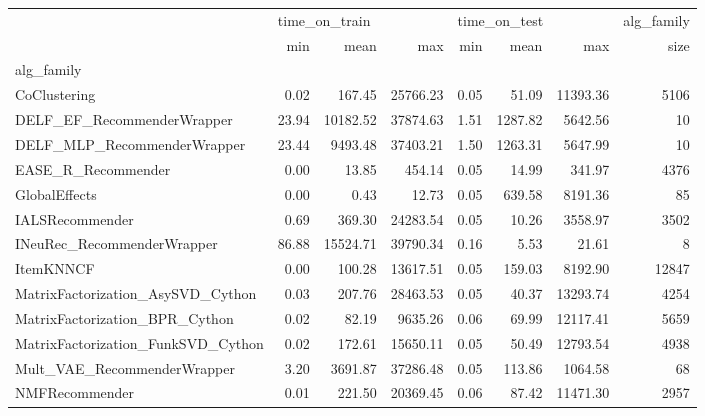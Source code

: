 \begin{tabular}{lrrrrrrr}
\toprule
{} & \multicolumn{3}{l}{time_on_train} & \multicolumn{3}{l}{time_on_test} & alg_family \\
{} &           min &     mean &      max &          min &    mean &      max &       size \\
alg_family                         &               &          &          &              &         &          &            \\
\midrule
CoClustering                       &          0.02 &   167.45 & 25766.23 &         0.05 &   51.09 & 11393.36 &       5106 \\
DELF_EF_RecommenderWrapper         &         23.94 & 10182.52 & 37874.63 &         1.51 & 1287.82 &  5642.56 &         10 \\
DELF_MLP_RecommenderWrapper        &         23.44 &  9493.48 & 37403.21 &         1.50 & 1263.31 &  5647.99 &         10 \\
EASE_R_Recommender                 &          0.00 &    13.85 &   454.14 &         0.05 &   14.99 &   341.97 &       4376 \\
GlobalEffects                      &          0.00 &     0.43 &    12.73 &         0.05 &  639.58 &  8191.36 &         85 \\
IALSRecommender                    &          0.69 &   369.30 & 24283.54 &         0.05 &   10.26 &  3558.97 &       3502 \\
INeuRec_RecommenderWrapper         &         86.88 & 15524.71 & 39790.34 &         0.16 &    5.53 &    21.61 &          8 \\
ItemKNNCF                          &          0.00 &   100.28 & 13617.51 &         0.05 &  159.03 &  8192.90 &      12847 \\
MatrixFactorization_AsySVD_Cython  &          0.03 &   207.76 & 28463.53 &         0.05 &   40.37 & 13293.74 &       4254 \\
MatrixFactorization_BPR_Cython     &          0.02 &    82.19 &  9635.26 &         0.06 &   69.99 & 12117.41 &       5659 \\
MatrixFactorization_FunkSVD_Cython &          0.02 &   172.61 & 15650.11 &         0.05 &   50.49 & 12793.54 &       4938 \\
Mult_VAE_RecommenderWrapper        &          3.20 &  3691.87 & 37286.48 &         0.05 &  113.86 &  1064.58 &         68 \\
NMFRecommender                     &          0.01 &   221.50 & 20369.45 &         0.06 &   87.42 & 11471.30 &       2957 \\

\end{tabular}
